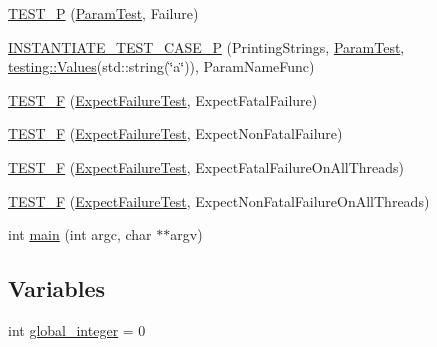 \begin{DoxyCompactItemize}
\item 
\mbox{\hyperlink{_obj__test_2lib_2googletest-release-1_88_81_2googletest_2test_2googletest-output-test___8cc_a0847a99be23b980115e2dd88a1bd60cc}{T\+E\+S\+T\+\_\+P}} (\mbox{\hyperlink{class_param_test}{Param\+Test}}, Failure)
\item 
\mbox{\hyperlink{_obj__test_2lib_2googletest-release-1_88_81_2googletest_2test_2googletest-output-test___8cc_a00b51dcd9ffaced8ceefcc4caf87c334}{I\+N\+S\+T\+A\+N\+T\+I\+A\+T\+E\+\_\+\+T\+E\+S\+T\+\_\+\+C\+A\+S\+E\+\_\+P}} (Printing\+Strings, \mbox{\hyperlink{class_param_test}{Param\+Test}}, \mbox{\hyperlink{namespacetesting_abd3c87b40c2a0663691c9b617ed5fcc2}{testing\+::\+Values}}(std\+::string(\char`\"{}a\char`\"{})), Param\+Name\+Func)
\item 
\mbox{\hyperlink{_obj__test_2lib_2googletest-release-1_88_81_2googletest_2test_2googletest-output-test___8cc_ae7459e6b9516821fd0e77eb3aa9b7413}{T\+E\+S\+T\+\_\+F}} (\mbox{\hyperlink{class_expect_failure_test}{Expect\+Failure\+Test}}, Expect\+Fatal\+Failure)
\item 
\mbox{\hyperlink{_obj__test_2lib_2googletest-release-1_88_81_2googletest_2test_2googletest-output-test___8cc_abec150ac715359c89fde1102cfc300d2}{T\+E\+S\+T\+\_\+F}} (\mbox{\hyperlink{class_expect_failure_test}{Expect\+Failure\+Test}}, Expect\+Non\+Fatal\+Failure)
\item 
\mbox{\hyperlink{_obj__test_2lib_2googletest-release-1_88_81_2googletest_2test_2googletest-output-test___8cc_a1f29562e9248524dda90aa6d641d77ea}{T\+E\+S\+T\+\_\+F}} (\mbox{\hyperlink{class_expect_failure_test}{Expect\+Failure\+Test}}, Expect\+Fatal\+Failure\+On\+All\+Threads)
\item 
\mbox{\hyperlink{_obj__test_2lib_2googletest-release-1_88_81_2googletest_2test_2googletest-output-test___8cc_a7714d1899711a604704737897595e7c3}{T\+E\+S\+T\+\_\+F}} (\mbox{\hyperlink{class_expect_failure_test}{Expect\+Failure\+Test}}, Expect\+Non\+Fatal\+Failure\+On\+All\+Threads)
\item 
int \mbox{\hyperlink{_obj__test_2lib_2googletest-release-1_88_81_2googletest_2test_2googletest-output-test___8cc_a3c04138a5bfe5d72780bb7e82a18e627}{main}} (int argc, char $\ast$$\ast$argv)
\end{DoxyCompactItemize}
\subsection*{Variables}
\begin{DoxyCompactItemize}
\item 
int \mbox{\hyperlink{_obj__test_2lib_2googletest-release-1_88_81_2googletest_2test_2googletest-output-test___8cc_a81be7f35ea2573ecc7ca08b26b56bccf}{global\+\_\+integer}} = 0
\end{DoxyCompactItemize}


